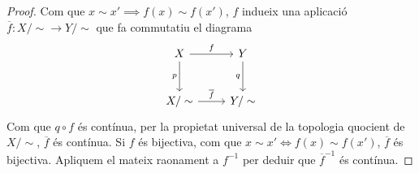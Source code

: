 \begin{proof}
    Com que $x\sim x' \implies f\left( x \right) \sim f\left( x' \right)$, $f$ indueix una aplicació $\overline{f}\colon X/\sim \rightarrow Y/\sim$ que fa commutatiu el diagrama
        \[
            \begin{tikzcd}
                X\ar{r}{f}\ar{d}[swap]{p} & Y\ar{d}[swap]{q}\\[2ex]
                X/\sim \ar{r}{\overline{f}} & Y/\sim
            \end{tikzcd}
        \]
        Com que $q\circ f$ \'es contínua, per la propietat universal de la topologia quocient de $X/\sim$, $\overline{f}$ \'es contínua. Si $f$ \'es bijectiva, com que $x\sim x' \iff f\left( x \right) \sim f\left( x' \right)$, $\overline{f}$ \'es bijectiva. Apliquem el mateix raonament a $f^{-1}$ per deduir que $\overline{f}^{-1}$ \'es contínua.
\end{proof}
